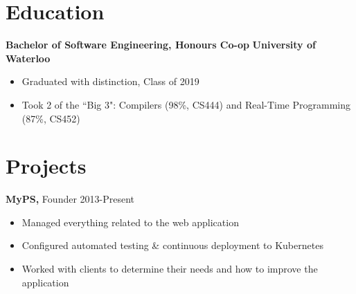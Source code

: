 \documentclass[line, centered]{res}
\begin{document}
\begin{resume}
 \section{Education}
 \vspace{2pt}
 \textbf{Bachelor of Software Engineering, Honours Co-op} \hfill {\bf University of Waterloo}
 \begin{itemize} \itemsep -1pt
  \item Graduated with distinction, Class of 2019
  \item Took 2 of the ``Big 3": Compilers (98\%, CS444) and Real-Time Programming (87\%, CS452)
 \end{itemize}

\section{Projects}
{\bf MyPS,} Founder     \hfill 2013-Present
\begin{itemize} \itemsep -1pt
   \item Managed everything related to the web application
   \item Configured automated testing \& continuous deployment to Kubernetes
   \item Worked with clients to determine their needs and how to improve the application
\end{itemize}

\end{resume}
\end{document}
